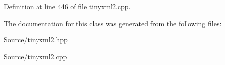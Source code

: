 Definition at line 446 of file tinyxml2.\-cpp.



The documentation for this class was generated from the following files\-:\begin{DoxyCompactItemize}
\item 
Source/\hyperlink{tinyxml2_8hpp}{tinyxml2.\-hpp}\item 
Source/\hyperlink{tinyxml2_8cpp}{tinyxml2.\-cpp}\end{DoxyCompactItemize}
